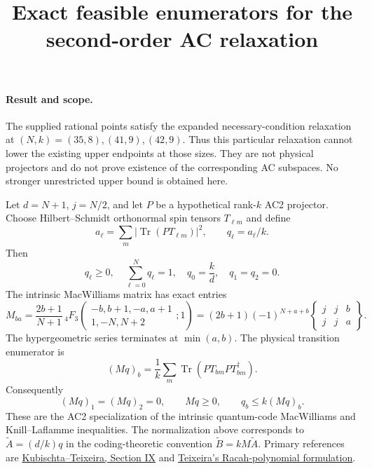 \documentclass[11pt]{article}
\begin{document}
\title{Exact feasible enumerators for the second-order AC relaxation}
\author{}\date{}\maketitle
\paragraph{Result and scope.}
The supplied rational points satisfy the expanded necessary-condition
relaxation at $(N,k)=(35,8),(41,9),(42,9)$. Thus this particular relaxation
cannot lower the existing upper endpoints at those sizes. They are not
physical projectors and do not prove existence of the corresponding
AC subspaces. No stronger unrestricted upper bound is obtained here.

Let $d=N+1$, $j=N/2$, and let $P$ be a hypothetical rank-$k$ AC2 projector.
Choose Hilbert--Schmidt orthonormal spin tensors $T_{\ell m}$ and define
\[
 a_\ell=\sum_m|\operatorname{Tr}(PT_{\ell m})|^2,
 \qquad q_\ell=a_\ell/k.
\]
Then
\[
 q_\ell\ge0,\quad\sum_{\ell=0}^Nq_\ell=1,\quad
 q_0=\frac{k}{d},\quad q_1=q_2=0.
\]
The intrinsic MacWilliams matrix has exact entries
\[
 M_{b a}=\frac{2b+1}{N+1}\,
 {}_4F_3\!\left(\begin{matrix}-b,b+1,-a,a+1\\1,-N,N+2\end{matrix};1\right)
 =(2b+1)(-1)^{N+a+b}
 \begin{Bmatrix}j&j&b\\j&j&a\end{Bmatrix}.
\]
The hypergeometric series terminates at $\min(a,b)$.
The physical transition enumerator is
\[
 (Mq)_b=\frac1k\sum_m\operatorname{Tr}
   (PT_{bm}PT_{bm}^\dagger).
\]
Consequently
\[
 (Mq)_1=(Mq)_2=0,\qquad Mq\ge0,\qquad q_b\le k(Mq)_b.
\]
These are the AC2 specialization of the intrinsic quantum-code
MacWilliams and Knill--Laflamme inequalities. The normalization above
corresponds to $\widetilde A=(d/k)q$ in the coding-theoretic convention
$\widetilde B=kM\widetilde A$.
Primary references are
\href{https://arxiv.org/html/2605.22439v1}{Kubischta--Teixeira, Section IX}
and \href{https://arxiv.org/abs/2605.15372}{Teixeira's Racah-polynomial formulation}.
\end{document}
